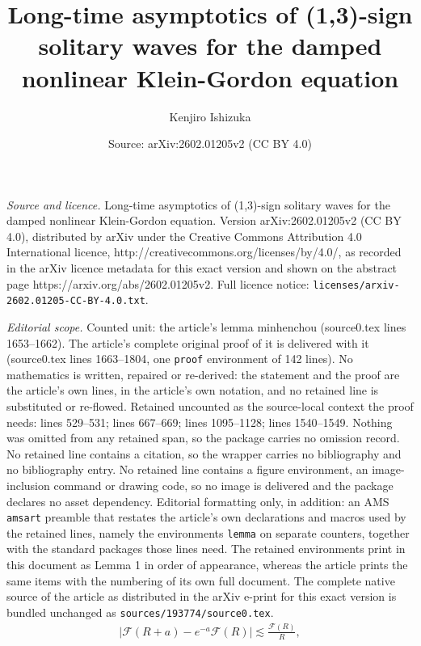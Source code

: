 \documentclass[10pt,a4paper]{amsart}
\title{Long-time asymptotics of (1,3)-sign solitary waves for the damped nonlinear Klein-Gordon equation}
\author{Kenjiro Ishizuka}
\date{Source: arXiv:2602.01205v2 (CC BY 4.0)}
\begin{document}
\maketitle

\noindent\emph{Source and licence.} Long-time asymptotics of (1,3)-sign solitary waves for the damped nonlinear Klein-Gordon equation. Version arXiv:2602.01205v2 (CC BY 4.0), distributed by arXiv under the Creative Commons Attribution 4.0 International licence, http://creativecommons.org/licenses/by/4.0/, as recorded in the arXiv licence metadata for this exact version and shown on the abstract page https://arxiv.org/abs/2602.01205v2. Full licence notice: \texttt{licenses/arxiv-2602.01205-CC-BY-4.0.txt}.\par\smallskip

\noindent\textit{Editorial scope.} Counted unit: the article's lemma minhenchou (source0.tex lines 1653--1662). The article's complete original proof of it is delivered with it (source0.tex lines 1663--1804, one \texttt{proof} environment of 142 lines). No mathematics is written, repaired or re-derived: the statement and the proof are the article's own lines, in the article's own notation, and no retained line is substituted or re-flowed.  Retained uncounted as the source-local context the proof needs: lines 529--531; lines 667--669; lines 1095--1128; lines 1540--1549.  Nothing was omitted from any retained span, so the package carries no omission record.  No retained line contains a citation, so the wrapper carries no bibliography and no bibliography entry.  No retained line contains a figure environment, an image-inclusion command or drawing code, so no image is delivered and the package declares no asset dependency.  Editorial formatting only, in addition: an AMS \texttt{amsart} preamble that restates the article's own declarations and macros used by the retained lines, namely the environments \texttt{lemma} on separate counters, together with the standard packages those lines need.  The retained environments print in this document as Lemma 1 in order of appearance, whereas the article prints the same items with the numbering of its own full document.  The complete native source of the article as distributed in the arXiv e-print for this exact version is bundled unchanged as \texttt{sources/193774/source0.tex}.
\begin{align}\label{tukaeruF1}
\left|\mathcal{F}(R+a)-e^{-a}\mathcal{F}(R)\right|\lesssim \frac{\mathcal{F}(R)}{R},
\end{align}
\end{document}
